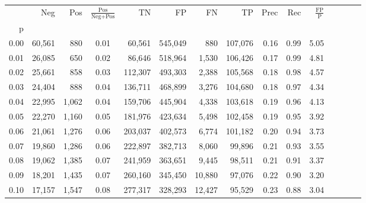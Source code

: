 \begin{tabular}{rrrcrrrrrrrrrrr}
\toprule
{} &     Neg &     Pos & $\frac{\text{Pos}}{\text{Neg}+\text{Pos}}$ &       TN &       FP &       FN &       TP &  Prec &   Rec & $\frac{\text{FP}}{\text{P}}$ \\
p    &         &         &                                            &          &          &          &          &       &       &                              \\
\midrule
0.00 &  60,561 &     880 &                                       0.01 &   60,561 &  545,049 &      880 &  107,076 &  0.16 &  0.99 &                         5.05 \\
0.01 &  26,085 &     650 &                                       0.02 &   86,646 &  518,964 &    1,530 &  106,426 &  0.17 &  0.99 &                         4.81 \\
0.02 &  25,661 &     858 &                                       0.03 &  112,307 &  493,303 &    2,388 &  105,568 &  0.18 &  0.98 &                         4.57 \\
0.03 &  24,404 &     888 &                                       0.04 &  136,711 &  468,899 &    3,276 &  104,680 &  0.18 &  0.97 &                         4.34 \\
0.04 &  22,995 &   1,062 &                                       0.04 &  159,706 &  445,904 &    4,338 &  103,618 &  0.19 &  0.96 &                         4.13 \\
0.05 &  22,270 &   1,160 &                                       0.05 &  181,976 &  423,634 &    5,498 &  102,458 &  0.19 &  0.95 &                         3.92 \\
0.06 &  21,061 &   1,276 &                                       0.06 &  203,037 &  402,573 &    6,774 &  101,182 &  0.20 &  0.94 &                         3.73 \\
0.07 &  19,860 &   1,286 &                                       0.06 &  222,897 &  382,713 &    8,060 &   99,896 &  0.21 &  0.93 &                         3.55 \\
0.08 &  19,062 &   1,385 &                                       0.07 &  241,959 &  363,651 &    9,445 &   98,511 &  0.21 &  0.91 &                         3.37 \\
0.09 &  18,201 &   1,435 &                                       0.07 &  260,160 &  345,450 &   10,880 &   97,076 &  0.22 &  0.90 &                         3.20 \\
0.10 &  17,157 &   1,547 &                                       0.08 &  277,317 &  328,293 &   12,427 &   95,529 &  0.23 &  0.88 &                         3.04 \\

\end{tabular}

